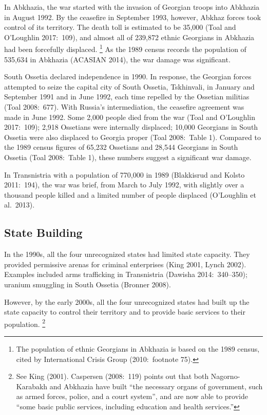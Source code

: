 \documentclass[12pt,a4paper]{article}%
\begin{document}
In Abkhazia, the war started with the invasion of Georgian troops into Abkhazia in August 1992. 
By the ceasefire in September 1993, however, Abkhaz forces took control of its territory.
The death toll is estimated to be 35,000 (Toal and O'Loughlin 2017:\ 109), and almost all of 239,872 ethnic Georgians in Abkhazia had been forcefully displaced.%
\footnote{
	The population of ethnic Georgians in Abkhazia is based on the 1989 census, cited by International Crisis Group (2010:\ footnote 75).
} 
As the 1989 census records the population of 535,634 in Abkhazia (ACASIAN 2014), the war damage was significant.

South Ossetia declared independence in 1990. 
In response, the Georgian forces attempted to seize the capital city of South Ossetia, Tskhinvali, in January and September 1991 and in June 1992, each time repelled by the Ossetian militias (Toal 2008:\ 677).
With Russia's intermediation, the ceasefire agreement was made in June 1992.
Some 2,000 people died from the war (Toal and O'Loughlin 2017:\ 109); 2,918 Ossetians were internally displaced; 10,000 Georgians in South Ossetia were also displaced to Georgia proper (Toal 2008:\ Table 1). 
Compared to the 1989 census figures of 65,232 Ossetians and 28,544 Georgians in South Ossetia (Toal 2008:\ Table 1), these numbers suggest a significant war damage.

In Transnistria with a population of 770,000 in 1989 (Blakkisrud and Kolsto 2011:\ 194), the war was brief, from March to July 1992, with slightly over a thousand people killed and a limited number of people displaced (O'Loughlin et al.\ 2013). 

\subsection{State Building}\label{state-building}
In the 1990s, all the four unrecognized states had limited state capacity.
They provided permissive arenas for criminal enterprises (King 2001, Lynch 2002).
Examples included arms trafficking in Transnistria (Dawisha 2014:\ 340--350); uranium smuggling in South Ossetia (Bronner 2008).

However, by the early 2000s, all the four unrecognized states had built up the state capacity to control their territory and to provide basic services to their population.%
\footnote{
	See King (2001). 
	Caspersen (2008:\ 119) points out that both Nagorno-Karabakh and Abkhazia have built ``the necessary organs of government, such as armed forces, police, and a court system'', and are now able to provide ``some basic public services, including education and health services.'' 
}
\end{document}
